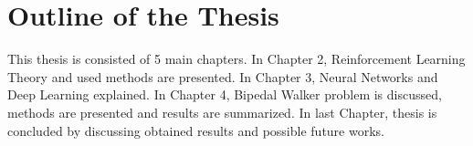 \section{Outline of the Thesis}
\label{sec:outline}
This thesis is consisted of 5 main chapters. 
In Chapter 2, Reinforcement Learning Theory and used methods are presented. 
In Chapter 3, Neural Networks and Deep Learning explained. 
In Chapter 4, Bipedal Walker problem is discussed, methods are presented and results are summarized. 
In last Chapter, thesis is concluded by discussing obtained results and possible future works.

